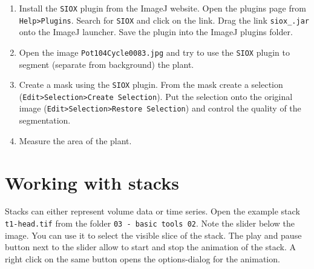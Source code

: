 \begin{enumerate}
\item Install the \texttt{SIOX} plugin from the ImageJ website. Open the plugins page from
\texttt{Help>Plugins}. Search for \texttt{SIOX} and click on the link. Drag the link \texttt{siox\_.jar} onto the ImageJ launcher. Save the plugin into the ImageJ plugins folder.
\item Open the image \texttt{Pot104Cycle0083.jpg} and try to use the \texttt{SIOX} plugin to segment (separate from background) the plant.
\item Create a mask using the \texttt{SIOX} plugin. From the mask create a selection
(\texttt{Edit>Selection>Create Selection}). Put the selection onto the original image (\texttt{Edit>Selection>Restore Selection}) and control the quality of the segmentation.
\item Measure the area of the plant.

\fbox{
	\begin{minipage}{\linewidth}
		\hfill\vspace{1cm}
	\end{minipage}
	}

\end{enumerate}

\section{Working with stacks}

Stacks can either represent volume data or time series. Open the example stack \texttt{t1-head.tif} from the folder \texttt{03 - basic tools 02}. Note the slider below the image. You can use it to select the visible slice of the stack. The play and pause button next to the slider allow to start and stop the animation of the stack. A right click on the same button opens the options-dialog for the animation.

